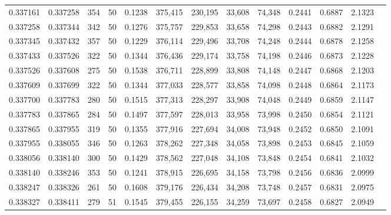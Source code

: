 \begin{tabular}{rrrrrrrrrrrrr}
0.337161 & 0.337258 &   354 &  50 &                                     0.1238 & 375,415 & 230,195 &  33,608 &  74,348 & 0.2441 & 0.6887 & 2.1323 \\
0.337258 & 0.337344 &   342 &  50 &                                     0.1276 & 375,757 & 229,853 &  33,658 &  74,298 & 0.2443 & 0.6882 & 2.1291 \\
0.337345 & 0.337432 &   357 &  50 &                                     0.1229 & 376,114 & 229,496 &  33,708 &  74,248 & 0.2444 & 0.6878 & 2.1258 \\
0.337433 & 0.337526 &   322 &  50 &                                     0.1344 & 376,436 & 229,174 &  33,758 &  74,198 & 0.2446 & 0.6873 & 2.1228 \\
0.337526 & 0.337608 &   275 &  50 &                                     0.1538 & 376,711 & 228,899 &  33,808 &  74,148 & 0.2447 & 0.6868 & 2.1203 \\
0.337609 & 0.337699 &   322 &  50 &                                     0.1344 & 377,033 & 228,577 &  33,858 &  74,098 & 0.2448 & 0.6864 & 2.1173 \\
0.337700 & 0.337783 &   280 &  50 &                                     0.1515 & 377,313 & 228,297 &  33,908 &  74,048 & 0.2449 & 0.6859 & 2.1147 \\
0.337783 & 0.337865 &   284 &  50 &                                     0.1497 & 377,597 & 228,013 &  33,958 &  73,998 & 0.2450 & 0.6854 & 2.1121 \\
0.337865 & 0.337955 &   319 &  50 &                                     0.1355 & 377,916 & 227,694 &  34,008 &  73,948 & 0.2452 & 0.6850 & 2.1091 \\
0.337955 & 0.338055 &   346 &  50 &                                     0.1263 & 378,262 & 227,348 &  34,058 &  73,898 & 0.2453 & 0.6845 & 2.1059 \\
0.338056 & 0.338140 &   300 &  50 &                                     0.1429 & 378,562 & 227,048 &  34,108 &  73,848 & 0.2454 & 0.6841 & 2.1032 \\
0.338140 & 0.338246 &   353 &  50 &                                     0.1241 & 378,915 & 226,695 &  34,158 &  73,798 & 0.2456 & 0.6836 & 2.0999 \\
0.338247 & 0.338326 &   261 &  50 &                                     0.1608 & 379,176 & 226,434 &  34,208 &  73,748 & 0.2457 & 0.6831 & 2.0975 \\
0.338327 & 0.338411 &   279 &  51 &                                     0.1545 & 379,455 & 226,155 &  34,259 &  73,697 & 0.2458 & 0.6827 & 2.0949 \\

\end{tabular}
